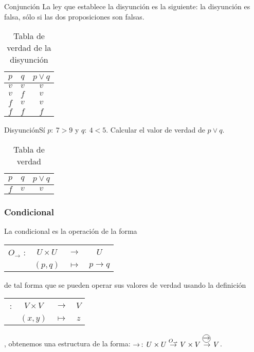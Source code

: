 \begin{definicionn}{ Conjunción} La ley que establece la disyunción
es la siguiente: la disyunción es falsa, sólo si las dos proposiciones
son falsas.\end{definicionn} 
\begin{table}[H]
\centering

\caption{Tabla de verdad de la disyunción}


\setlength\arrayrulewidth{1pt} 

\begin{tabular}{c|c|c}
\arrayrulecolor{ptctitle}\hline\cellcolor{ptctitle!50}$p$ & \cellcolor{ptctitle!50}$q$ & \cellcolor{ptctitle!50}$p\vee q$\tabularnewline
\hline\cellcolor{ptcbackground}$v$ & \cellcolor{ptcbackground} $v$ & \cellcolor{ptcbackground}$v$\tabularnewline
\hline\cellcolor{gray!50}$v$ & \cellcolor{gray!50} $f$ & \cellcolor{gray!50}$v$\tabularnewline
\hline\cellcolor{ptcbackground}$f$ & \cellcolor{ptcbackground} $v$ & \cellcolor{ptcbackground}$v$\tabularnewline
\hline\cellcolor{gray!50}$f$ & \cellcolor{gray!50} $f$ & \cellcolor{gray!50}$f$\tabularnewline
\end{tabular}
\end{table}


\begin{ejem}{Disyunción}Sí $p:\:7>9$ y $q:\ 4<5$. Calcular el
valor de verdad de $p\vee q.$ \end{ejem}

\solucion 
\begin{table}[H]
\centering

\caption{Tabla de verdad}


\begin{tabular}{c|c|c}
\arrayrulecolor{ptctitle}\cellcolor{gray!50}$p$ & \cellcolor{gray!50}$q$ & \cellcolor{gray!50}$p\vee q$\tabularnewline
\hline 
\cellcolor{ptcbackground}$f$ & \cellcolor{ptcbackground}$v$ & \cellcolor{ptcbackground}$v$\tabularnewline
\hline 
\end{tabular}
\end{table}



\subsubsection{Condicional}

La condicional es la operación de la forma %
\begin{tabular}{cccc}
$O_{\rightarrow}$ : & $U\times U$ & $\rightarrow$ & %
$U$%
\tabularnewline
 & $\left(p,q\right)$ & $\mapsto$ & $p\rightarrow q$\tabularnewline
\end{tabular}de tal forma que se pueden operar sus valores de verdad usando la
definición %
\begin{tabular}{cccc}
\oper{$\rightarrow$}\,: & $V\times V$ & $\rightarrow$ & %
$V$%
\tabularnewline
 & $\left(x,y\right)$ & $\mapsto$ & $z$\tabularnewline
\end{tabular}, obtenemos una estructura de la forma: $\rightarrow\,:\, U\times U\overset{O_{\rightarrow}}{\rightarrow}V\times V\overset{\oper{\ensuremath{\rightarrow}}\,}{\rightarrow}V$.

